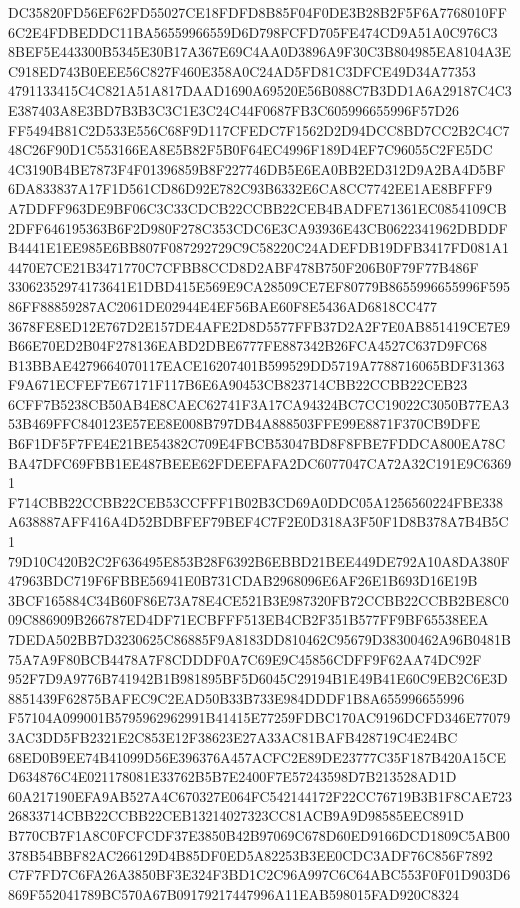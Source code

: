 \documentclass[UTF8,fontset=fandol,zihao=-4,a4paper]{ctexart}
\begin{document}
{{DC35820FD56EF62FD55027CE18FDFD8B85F04F0DE3B28B2F5F6A7768010FF6C2E4FDBEDDC11BA56559966559D6D798FCFD705FE474CD9A51A0C976C3
8BEF5E443300B5345E30B17A367E69C4AA0D3896A9F30C3B804985EA8104A3EC918ED743B0EEE56C827F460E358A0C24AD5FD81C3DFCE49D34A77353
4791133415C4C821A51A817DAAD1690A69520E56B088C7B3DD1A6A29187C4C3E387403A8E3BD7B3B3C3C1E3C24C44F0687FB3C605996655996F57D26
FF5494B81C2D533E556C68F9D117CFEDC7F1562D2D94DCC8BD7CC2B2C4C748C26F90D1C553166EA8E5B82F5B0F64EC4996F189D4EF7C96055C2FE5DC
4C3190B4BE7873F4F01396859B8F227746DB5E6EA0BB2ED312D9A2BA4D5BF6DA833837A17F1D561CD86D92E782C93B6332E6CA8CC7742EE1AE8BFFF9
A7DDFF963DE9BF06C3C33CDCB22CCBB22CEB4BADFE71361EC0854109CB2DFF646195363B6F2D980F278C353CDC6E3CA93936E43CB0622341962DBDDF
B4441E1EE985E6BB807F087292729C9C58220C24ADEFDB19DFB3417FD081A14470E7CE21B3471770C7CFBB8CCD8D2ABF478B750F206B0F79F77B486F
33062352974173641E1DBD415E569E9CA28509CE7EF80779B8655996655996F59586FF88859287AC2061DE02944E4EF56BAE60F8E5436AD6818CC477
3678FE8ED12E767D2E157DE4AFE2D8D5577FFB37D2A2F7E0AB851419CE7E9B66E70ED2B04F278136EABD2DBE6777FE887342B26FCA4527C637D9FC68
B13BBAE4279664070117EACE16207401B599529DD5719A7788716065BDF31363F9A671ECFEF7E67171F117B6E6A90453CB823714CBB22CCBB22CEB23
6CFF7B5238CB50AB4E8CAEC62741F3A17CA94324BC7CC19022C3050B77EA353B469FFC840123E57EE8E008B797DB4A888503FFE99E8871F370CB9DFE
B6F1DF5F7FE4E21BE54382C709E4FBCB53047BD8F8FBE7FDDCA800EA78CBA47DFC69FBB1EE487BEEE62FDEEFAFA2DC6077047CA72A32C191E9C63691
F714CBB22CCBB22CEB53CCFFF1B02B3CD69A0DDC05A1256560224FBE338A638887AFF416A4D52BDBFEF79BEF4C7F2E0D318A3F50F1D8B378A7B4B5C1
79D10C420B2C2F636495E853B28F6392B6EBBD21BEE449DE792A10A8DA380F47963BDC719F6FBBE56941E0B731CDAB2968096E6AF26E1B693D16E19B
3BCF165884C34B60F86E73A78E4CE521B3E987320FB72CCBB22CCBB2BE8C009C886909B266787ED4DF71ECBFFF513EB4CB2F351B577FF9BF65538EEA
7DEDA502BB7D3230625C86885F9A8183DD810462C95679D38300462A96B0481B75A7A9F80BCB4478A7F8CDDDF0A7C69E9C45856CDFF9F62AA74DC92F
952F7D9A9776B741942B1B981895BF5D6045C29194B1E49B41E60C9EB2C6E3D8851439F62875BAFEC9C2EAD50B33B733E984DDDF1B8A655996655996
F57104A099001B5795962962991B41415E77259FDBC170AC9196DCFD346E770793AC3DD5FB2321E2C853E12F38623E27A33AC81BAFB428719C4E24BC
68ED0B9EE74B41099D56E396376A457ACFC2E89DE23777C35F187B420A15CED634876C4E021178081E33762B5B7E2400F7E57243598D7B213528AD1D
60A217190EFA9AB527A4C670327E064FC542144172F22CC76719B3B1F8CAE72326833714CBB22CCBB22CEB13214027323CC81ACB9A9D98585EEC891D
B770CB7F1A8C0FCFCDF37E3850B42B97069C678D60ED9166DCD1809C5AB00378B54BBF82AC266129D4B85DF0ED5A82253B3EE0CDC3ADF76C856F7892
C7F7FD7C6FA26A3850BF3E324F3BD1C2C96A997C6C64ABC553F0F01D903D6869F552041789BC570A67B09179217447996A11EAB598015FAD920C8324
}}
\end{document}
